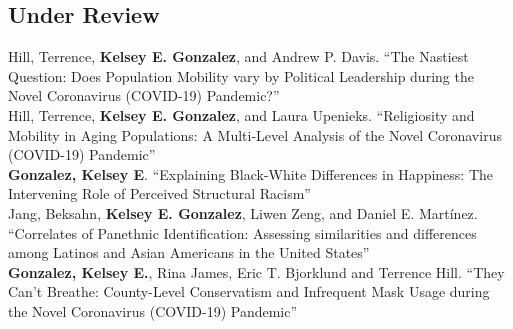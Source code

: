 \subsection*{Under Review}


\years{} Hill, Terrence, \textbf{Kelsey E. Gonzalez}, and Andrew P. Davis. ``The Nastiest Question: Does Population Mobility vary by Political Leadership during the Novel Coronavirus (COVID-19) Pandemic?'' 
  \\

\years{} Hill, Terrence, \textbf{Kelsey E. Gonzalez}, and Laura Upenieks. ``Religiosity and Mobility in Aging Populations: A Multi-Level Analysis of the Novel Coronavirus (COVID-19) Pandemic''
 \\

\years{} \textbf{Gonzalez, Kelsey E}. ``Explaining Black-White Differences in Happiness: The Intervening Role of Perceived Structural Racism'' 
  \\

\years{}Jang, Beksahn, \textbf{Kelsey E. Gonzalez}, Liwen Zeng, and Daniel E. Martínez. ``Correlates of Panethnic Identification: Assessing similarities and differences among Latinos and Asian Americans in the United States''
 \\

\years{} \textbf{Gonzalez, Kelsey E.}, Rina James, Eric T. Bjorklund and Terrence Hill. ``They Can’t Breathe: County-Level Conservatism and Infrequent Mask Usage during the Novel Coronavirus (COVID-19) Pandemic''  \\

